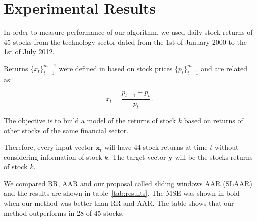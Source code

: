 \section{Experimental Results}

In order to measure performance of our algorithm, we used daily stock
returns of 45 stocks from the technology sector dated from the 1st of
January 2000 to the 1st of July 2012. 



\begin{figure}[h]
  \centering
\end{figure}

Returns $\{x_t\}_{t=1}^{m-1}$ were defined in based on stock prices
$\{{p_t}\}_{t=1}^m$ and are related as:

\begin{equation*}
x_t = \frac{p_{t+1}-p_t}{p_t} \, .
\end{equation*}

The objective is to build a model of the returns of stock $k$ based on
returns of other stocks of the same financial sector.

Therefore, every input vector $\mathbf{x}_t$ will have 44 stock
returns at time $t$ without considering information of stock $k$. The
target vector $\mathbf{y}$ will be the stocks returns of stock $k$.

We compared RR, AAR and our proposal called sliding windows AAR
(SLAAR) and the results are shown in table~\ref{tab:results}. The MSE
was shown in bold when our method was better than RR and AAR. The
table shows that our method outperforms in 28 of 45 stocks.

